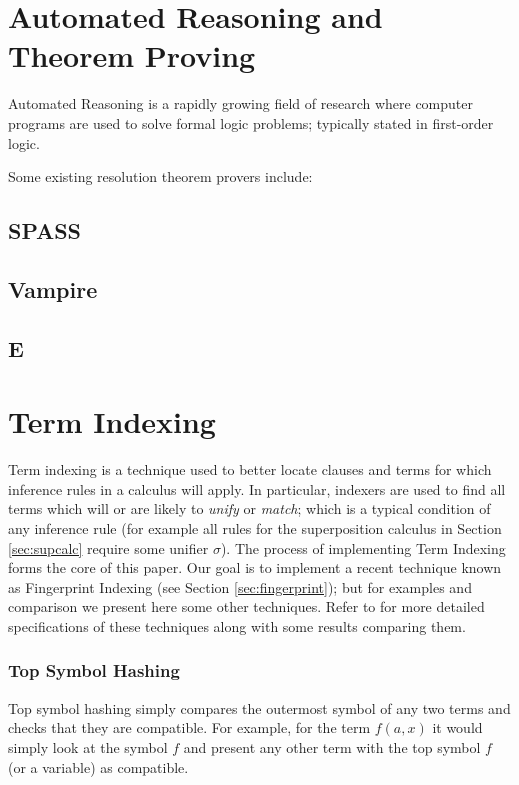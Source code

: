 \section{Automated Reasoning and Theorem Proving}
\label{sec:proving}

Automated Reasoning is a rapidly growing field of research where computer programs
are used to solve formal logic problems; typically stated in first-order logic.

Some existing resolution theorem provers include:

\subsection{SPASS}
\cite{spass}

\subsection{Vampire}
\cite{vampire}

\subsection{E}
\cite{eprover}

\section{Term Indexing}
\label{sec:indexing}


Term indexing is a technique used to better locate clauses and terms for which inference rules
in a calculus will apply. In particular, indexers are used to find all terms which
will or are likely to \emph{unify} or \emph{match}; which is a typical condition
of any inference rule (for example all rules for the superposition calculus
in Section \ref{sec:supcalc} require some unifier $\sigma$).
The process of implementing Term Indexing forms the core of this paper. Our goal
is to implement a recent technique known as Fingerprint Indexing (see Section \ref{sec:fingerprint});
but for examples and comparison we present here some other techniques.
Refer to \cite{indexing} for more detailed specifications of these techniques along
with some results comparing them.

\subsubsection{Top Symbol Hashing}
Top symbol hashing simply compares the outermost symbol of any two terms and checks
that they are compatible. For example, for the term $f(a,x)$ it would simply look
at the symbol $f$ and present any other term with the top symbol $f$ (or a variable) as compatible.

